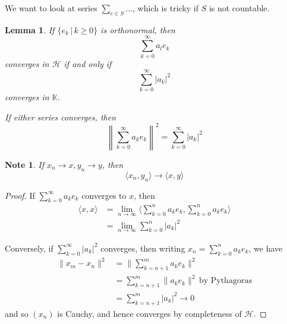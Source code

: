 \documentclass[12pt, oneside, a4paper]{article}
\newtheorem{lem}[thm]{Lemma}
\theoremstyle{dfn}
\newtheorem{note}[thm]{Note}
\newcommand{\K}{\mathbb{K}}
\newcommand{\Hil}{\mathcal{H}}
\begin{document}
    We want to look at series $\sum_{e \in S} ...$, which is tricky if $S$ is not countable.

\begin{lem}\label{lem:tod}
    If $\{ e_k \, | \, k \geq 0 \}$ is orthonormal, then \[
        \sum_{k=0}^\infty a_l e_k
    \] converges in $\Hil$ if and only if \[
        \sum_{k=0}^\infty |a_k |^2
    \] converges in $\K$.  
    
    If either series converges, then \[
        \left\| \sum_{k=0}^\infty a_k e_k \right\|^2 = \sum_{k=0}^\infty | a_k |^2
    \]
\end{lem}

\begin{note}
    If $x_n \rightarrow x,y_n \rightarrow y$, then \[
        \langle x_n, y_n \rangle \rightarrow \langle x, y \rangle
    \]
\end{note}


\begin{proof}
    If $\sum_{k=0}^\infty a_k e_k$ converges to $x$, then \begin{align*}
        \langle x, x \rangle &= \lim_{n \rightarrow \infty} \langle \sum_{k=0}^n a_k e_k, \sum_{k=0}^n a_k e_k \rangle \\
        &= \lim_{n \rightarrow \infty} \sum_{k=0}^n | a_k |^2
    \end{align*}
    
    Conversely, if $\sum_{k=0}^\infty |a_k |^2$ converges, then writing $x_n = \sum_{k=0}^n a_k e_k$, we have \begin{align*}
        \| x_m - x_n \|^2 &= \| \sum_{k=n+1}^m a_k e_k \|^2 \\
                        &= \sum_{k=n+1}^m \| a_k e_k \|^2 \, \text{by Pythagoras} \\
                        &= \sum_{k=n+1}^m |a_k |^2 \rightarrow 0
    \end{align*} and so $(x_n)$ is Cauchy, and hence converges by completeness of $\Hil$.  
\end{proof}
\end{document}
